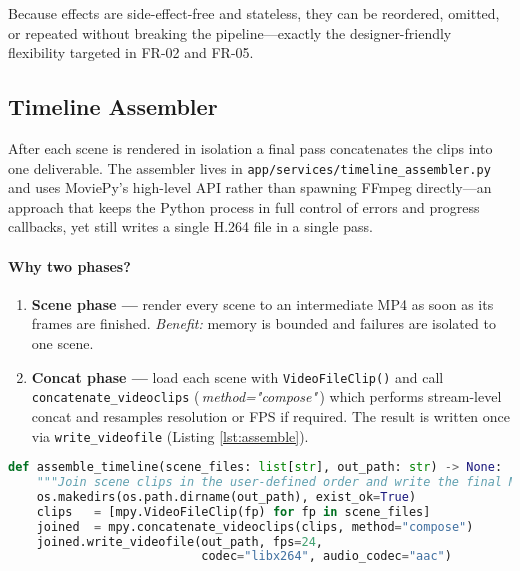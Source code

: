 Because effects are side-effect-free and stateless, they can be reordered,
omitted, or repeated without breaking the pipeline—exactly the
designer-friendly flexibility targeted in FR-02 and FR-05.


\subsection{Timeline Assembler}
\label{sec:timeline}

After each scene is rendered in isolation a final pass concatenates the clips
into one deliverable.  The assembler lives in
\texttt{app/services/timeline\_assembler.py} and uses MoviePy’s high-level
API rather than spawning FFmpeg directly—an approach that keeps the Python
process in full control of errors and progress callbacks, yet still writes a
single H.264 file in a single pass.

\paragraph{Why two phases?}
\begin{enumerate}
  \item \textbf{Scene phase —} render every scene to an intermediate MP4 as
        soon as its frames are finished.  
        \textit{Benefit:} memory is bounded and failures are isolated to one scene.
  \item \textbf{Concat phase —} load each scene with
        \texttt{VideoFileClip()} and call
        \texttt{concatenate\_videoclips} (\,\textit{method="compose"}\,)
        which performs stream-level concat and resamples resolution or FPS if
        required.  The result is written once via
        \texttt{write\_videofile} (Listing \ref{lst:assemble}).
\end{enumerate}

\begin{lstlisting}[language=python,caption={Timeline assembler used by the worker},
  label={lst:assemble},basicstyle=\scriptsize\ttfamily]
def assemble_timeline(scene_files: list[str], out_path: str) -> None:
    """Join scene clips in the user-defined order and write the final MP4."""
    os.makedirs(os.path.dirname(out_path), exist_ok=True)
    clips   = [mpy.VideoFileClip(fp) for fp in scene_files]
    joined  = mpy.concatenate_videoclips(clips, method="compose")
    joined.write_videofile(out_path, fps=24,
                           codec="libx264", audio_codec="aac")
\end{lstlisting}

